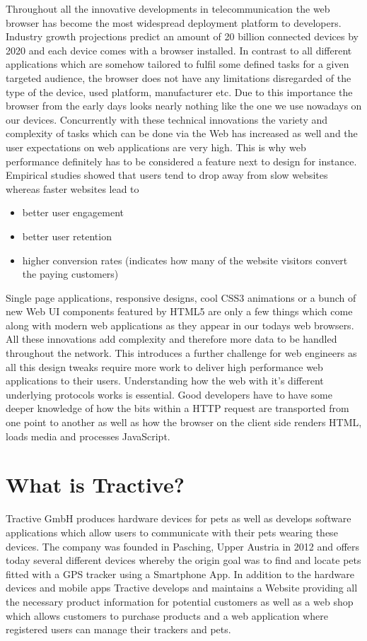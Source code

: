 Throughout all the innovative developments in telecommunication the web browser has become the most widespread deployment platform to developers. Industry growth projections predict an amount of 20 billion connected devices by 2020 and each device comes with a browser installed. In contrast to all different applications which are somehow tailored to fulfil some defined tasks for a given targeted audience, the browser does not have any limitations disregarded of the type of the device, used platform, manufacturer etc. Due to this importance the browser from the early days looks nearly nothing like the one we use nowadays on our devices. Concurrently with these technical innovations the variety and complexity of tasks which can be done via the Web has increased as well and the user expectations on web applications are very high. This is why web performance definitely has to be considered a feature next to design for instance. Empirical studies showed that users tend to drop away from slow websites whereas faster websites lead to
	\begin{itemize}
		\item better user engagement
		\item better user retention
		\item higher conversion rates (indicates how many of the website visitors convert the paying customers)
	\end{itemize}
Single page applications, responsive designs, cool CSS3 animations or a bunch of new Web UI components featured by HTML5 are only a few things which come along with modern web applications as they appear in our todays web browsers. All these innovations add complexity and therefore more data to be handled throughout the network. This introduces a further challenge for web engineers as all this design tweaks require more work to deliver high performance web applications to their users.    
Understanding how the web with it's different underlying protocols works is essential. Good developers have to have some deeper knowledge of how the bits within a HTTP request are transported from one point to another as well as how the browser on the client side renders HTML, loads media and processes JavaScript. ~\cite{Grigorik_2013}

\section{What is Tractive?}

Tractive GmbH produces hardware devices for pets as well as develops software applications which allow users to communicate with their pets wearing these devices. The company was founded in Pasching, Upper Austria in 2012 and offers today several different devices whereby the origin goal was to find and locate pets fitted with a GPS tracker using a Smartphone App. In addition to the hardware devices and mobile apps Tractive develops and maintains a Website providing all the necessary product information for potential customers as well as a web shop which allows customers to purchase products and a web application where registered users can manage their trackers and pets. 

